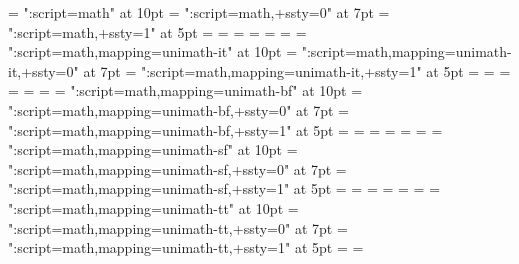 \newfam\mrmfam
\font  \tenmrm = "\mathalphafontname:script=math" at 10pt
\font\sevenmrm = "\mathalphafontname:script=math,+ssty=0" at 7pt
\font \fivemrm = "\mathalphafontname:script=math,+ssty=1" at 5pt
\textfont         \mrmfam =   \tenmrm
\scriptfont       \mrmfam = \sevenmrm
\scriptscriptfont \mrmfam =  \fivemrm
\def\mrm{\fam\mrmfam}
\newfam\textrmfam
\textfont         \textrmfam =   \tenrm
\scriptfont       \textrmfam = \sevenrm
\scriptscriptfont \textrmfam =  \fiverm
\def\rm{\fam\textrmfam\tenrm}
\newfam\mitfam
\font  \tenmit = "\mathalphafontname:script=math,mapping=unimath-it" at 10pt
\font\sevenmit = "\mathalphafontname:script=math,mapping=unimath-it,+ssty=0" at 7pt
\font \fivemit = "\mathalphafontname:script=math,mapping=unimath-it,+ssty=1" at 5pt
\textfont         \mitfam =   \tenmit
\scriptfont       \mitfam = \sevenmit
\scriptscriptfont \mitfam =  \fivemit
\def\mit{\fam\mitfam}
\newfam\textitfam
\textfont         \textitfam =   \tenit
\scriptfont       \textitfam = \sevenit
\scriptscriptfont \textitfam =  \fiveit
\def\it{\fam\textitfam\tenit}
\newfam\mbffam
\font  \tenmbf = "\mathalphafontname:script=math,mapping=unimath-bf" at 10pt
\font\sevenmbf = "\mathalphafontname:script=math,mapping=unimath-bf,+ssty=0" at 7pt
\font \fivembf = "\mathalphafontname:script=math,mapping=unimath-bf,+ssty=1" at 5pt
\textfont         \mbffam =   \tenmbf
\scriptfont       \mbffam = \sevenmbf
\scriptscriptfont \mbffam =  \fivembf
\def\mbf{\fam\mbffam}
\newfam\textbffam
\textfont         \textbffam =   \tenbf
\scriptfont       \textbffam = \sevenbf
\scriptscriptfont \textbffam =  \fivebf
\def\bf{\fam\textbffam\tenbf}
\newfam\msffam
\font  \tenmsf = "\mathalphafontname:script=math,mapping=unimath-sf" at 10pt
\font\sevenmsf = "\mathalphafontname:script=math,mapping=unimath-sf,+ssty=0" at 7pt
\font \fivemsf = "\mathalphafontname:script=math,mapping=unimath-sf,+ssty=1" at 5pt
\textfont         \msffam =   \tenmsf
\scriptfont       \msffam = \sevenmsf
\scriptscriptfont \msffam =  \fivemsf
\def\msf{\fam\msffam}
\newfam\textsffam
\textfont         \textsffam =   \tensf
\scriptfont       \textsffam = \sevensf
\scriptscriptfont \textsffam =  \fivesf
\def\sf{\fam\textsffam\tensf}
\newfam\mttfam
\font  \tenmtt = "\mathalphafontname:script=math,mapping=unimath-tt" at 10pt
\font\sevenmtt = "\mathalphafontname:script=math,mapping=unimath-tt,+ssty=0" at 7pt
\font \fivemtt = "\mathalphafontname:script=math,mapping=unimath-tt,+ssty=1" at 5pt
\textfont         \mttfam =   \tenmtt
\scriptfont       \mttfam = \sevenmtt
